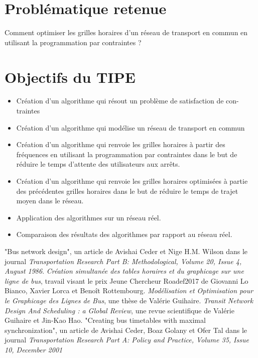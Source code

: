 \documentclass{article}
\begin{document}
\section{Problématique retenue}

Comment optimiser les grilles horaires d'un réseau de transport en commun en utilisant la programmation par contraintes ?

\section{Objectifs du TIPE}

\begin{itemize}
    \item Création d'un algorithme qui résout un problème de satisfaction de con-traintes
    \item Création d'un algorithme qui modélise un réseau de transport en commun
    \item Création d'un algorithme qui renvoie les grilles horaires à partir des fréquences en utilisant la programmation par contraintes dans le but de réduire le temps d'attente des utilisateurs aux arrêts.
    \item Création d'un algorithme qui renvoie les grilles horaires optimisées à partie des précédentes grilles horaires dans le but de réduire le temps de trajet moyen dans le réseau.
    \item Application des algorithmes sur un réseau réel.
    \item Comparaison des résultats des algorithmes par rapport au réseau réel.
\end{itemize}

\begin{thebibliography}{9}
    "Bus network design", un article de Avishai Ceder et Nige H.M. Wilson dans le journal \textit{Transportation Research Part B: Methodological, Volume 20, Issue 4, August 1986}.
    \textit{Création simultanée des tables horaires et du graphicage sur une ligne de bus}, travail visant le prix Jeune Chercheur Roadef2017 de Giovanni Lo Bianco, Xavier Lorca et Benoît Rottembourg.
    \textit{Modélisation et Optimisation pour le Graphicage des Lignes de Bus}, une thèse de Valérie Guihaire.
    \textit{Transit Network Design And Scheduling : a Global Review}, une revue scientifique de Valérie Guihaire et Jin-Kao Hao.
    "Creating bus timetables with maximal synchronization", un article de Avishai Ceder, Boaz Golany et Ofer Tal dans le journal \textit{Transportation Research Part A: Policy and Practice, Volume 35, Issue 10, December 2001}
\end{thebibliography}
\end{document}
